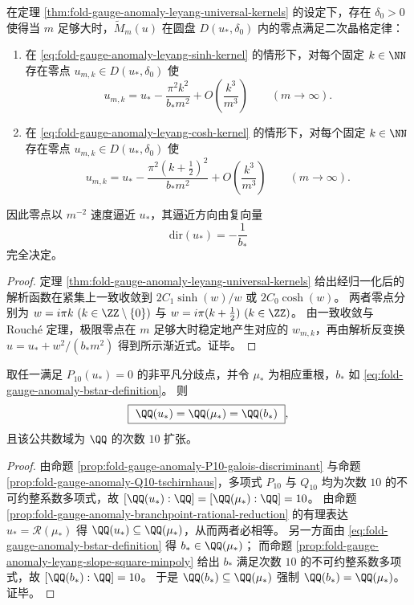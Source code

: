 \begin{corollary}\label{cor:fold-gauge-anomaly-leyang-quadratic-lattice-zeros}
在定理 \ref{thm:fold-gauge-anomaly-leyang-universal-kernels} 的设定下，存在 \(\delta_0>0\) 使得当 \(m\) 足够大时，\(\widetilde M_m(u)\) 在圆盘 \(D(u_\ast,\delta_0)\) 内的零点满足二次晶格定律：
\begin{enumerate}
  \item 在 \eqref{eq:fold-gauge-anomaly-leyang-sinh-kernel} 的情形下，对每个固定 \(k\in\NN\) 存在零点 \(u_{m,k}\in D(u_\ast,\delta_0)\) 使
  \[
  u_{m,k}=u_\ast-\frac{\pi^2 k^2}{b_\ast m^2}+O\!\left(\frac{k^3}{m^3}\right)\qquad(m\to\infty).
  \]
  \item 在 \eqref{eq:fold-gauge-anomaly-leyang-cosh-kernel} 的情形下，对每个固定 \(k\in\NN\) 存在零点 \(u_{m,k}\in D(u_\ast,\delta_0)\) 使
  \[
  u_{m,k}=u_\ast-\frac{\pi^2 (k+\tfrac12)^2}{b_\ast m^2}+O\!\left(\frac{k^3}{m^3}\right)\qquad(m\to\infty).
  \]
\end{enumerate}
因此零点以 \(m^{-2}\) 速度逼近 \(u_\ast\)，其逼近方向由复向量
\[
\boxed{\ \mathrm{dir}(u_\ast)=-\frac{1}{b_\ast}\ }
\]
完全决定。
\end{corollary}
\begin{proof}
定理 \ref{thm:fold-gauge-anomaly-leyang-universal-kernels} 给出经归一化后的解析函数在紧集上一致收敛到
\(
2C_1\sinh(w)/w
\)
或
\(
2C_0\cosh(w)
\)。
两者零点分别为 \(w=i\pi k\ (k\in\ZZ\setminus\{0\})\) 与 \(w=i\pi(k+\tfrac12)\ (k\in\ZZ)\)。
由一致收敛与 Rouch\'e 定理，极限零点在 \(m\) 足够大时稳定地产生对应的 \(w_{m,k}\)，再由解析反变换 \(u=u_\ast+w^2/(b_\ast m^2)\) 得到所示渐近式。证毕。
\end{proof}

\begin{corollary}\label{cor:fold-gauge-anomaly-field-equality-u-mu-b}
取任一满足 \(P_{10}(u_\ast)=0\) 的非平凡分歧点，并令 \(\mu_\ast\) 为相应重根，\(b_\ast\) 如 \eqref{eq:fold-gauge-anomaly-bstar-definition}。
则
\[
\boxed{\ \QQ(u_\ast)=\QQ(\mu_\ast)=\QQ(b_\ast)\ } ,
\]
且该公共数域为 \(\QQ\) 的次数 \(10\) 扩张。
\end{corollary}
\begin{proof}
由命题 \ref{prop:fold-gauge-anomaly-P10-galois-discriminant} 与命题 \ref{prop:fold-gauge-anomaly-Q10-tschirnhaus}，多项式 \(P_{10}\) 与 \(Q_{10}\) 均为次数 \(10\) 的不可约整系数多项式，故 \([\QQ(u_\ast):\QQ]=[\QQ(\mu_\ast):\QQ]=10\)。
由命题 \ref{prop:fold-gauge-anomaly-branchpoint-rational-reduction} 的有理表达 \(u_\ast=\mathcal R(\mu_\ast)\) 得 \(\QQ(u_\ast)\subseteq \QQ(\mu_\ast)\)，从而两者必相等。
另一方面由 \eqref{eq:fold-gauge-anomaly-bstar-definition} 得 \(b_\ast\in\QQ(\mu_\ast)\)；
而命题 \ref{prop:fold-gauge-anomaly-leyang-slope-square-minpoly} 给出 \(b_\ast\) 满足次数 \(10\) 的不可约整系数多项式，故 \([\QQ(b_\ast):\QQ]=10\)。
于是 \(\QQ(b_\ast)\subseteq\QQ(\mu_\ast)\) 强制 \(\QQ(b_\ast)=\QQ(\mu_\ast)\)。证毕。
\end{proof}

